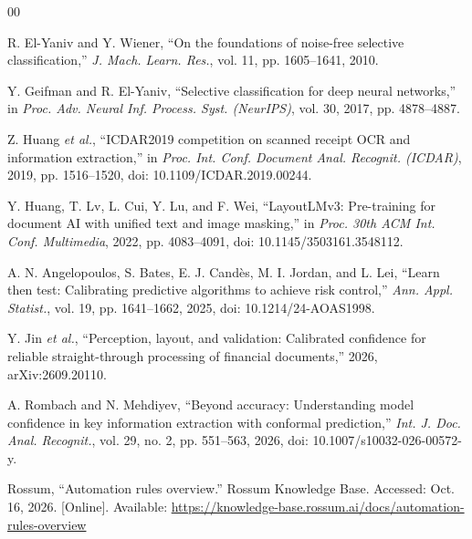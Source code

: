 \documentclass[conference]{IEEEtran}
\begin{document}
\begin{thebibliography}{00}

R. El-Yaniv and Y. Wiener, ``On the foundations of noise-free selective
classification,'' \emph{J. Mach. Learn. Res.}, vol. 11, pp. 1605--1641, 2010.

Y. Geifman and R. El-Yaniv, ``Selective classification for deep neural
networks,'' in \emph{Proc. Adv. Neural Inf. Process. Syst. (NeurIPS)}, vol. 30,
2017, pp. 4878--4887.

Z. Huang \emph{et al.}, ``ICDAR2019 competition on scanned receipt OCR and
information extraction,'' in \emph{Proc. Int. Conf. Document Anal. Recognit.
(ICDAR)}, 2019, pp. 1516--1520, doi: 10.1109/ICDAR.2019.00244.

Y. Huang, T. Lv, L. Cui, Y. Lu, and F. Wei, ``LayoutLMv3: Pre-training for
document AI with unified text and image masking,'' in \emph{Proc. 30th ACM Int.
Conf. Multimedia}, 2022, pp. 4083--4091, doi: 10.1145/3503161.3548112.

A. N. Angelopoulos, S. Bates, E. J. Cand\`es, M. I. Jordan, and L. Lei, ``Learn
then test: Calibrating predictive algorithms to achieve risk control,''
\emph{Ann. Appl. Statist.}, vol. 19, pp. 1641--1662, 2025,
doi: 10.1214/24-AOAS1998.

Y. Jin \emph{et al.}, ``Perception, layout, and validation: Calibrated
confidence for reliable straight-through processing of financial documents,''
2026, arXiv:2609.20110.

A. Rombach and N. Mehdiyev, ``Beyond accuracy: Understanding model confidence in
key information extraction with conformal prediction,'' \emph{Int. J. Doc. Anal.
Recognit.}, vol. 29, no. 2, pp. 551--563, 2026,
doi: 10.1007/s10032-026-00572-y.

Rossum, ``Automation rules overview.'' Rossum Knowledge Base. Accessed: Oct. 16,
2026. [Online]. Available:
\url{https://knowledge-base.rossum.ai/docs/automation-rules-overview}


\end{thebibliography}
\end{document}
